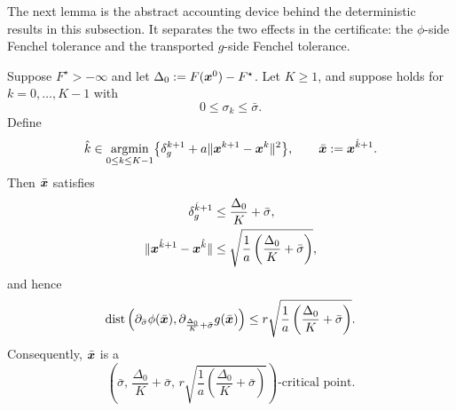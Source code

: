The next lemma is the abstract accounting device behind the
deterministic results in this subsection. It separates the two effects
in the certificate: the $\phi$-side Fenchel tolerance and the
transported $g$-side Fenchel tolerance.

\begin{lemma}
\label{lem:abstract-prox-certificate-bound}
Suppose $F^\star>-\infty$ and let $\Delta_0:=F(\bm{x}^0)-F^\star$. Let
$K\ge1$, and suppose  holds for
$k=0,\ldots,K-1$ with
\[
    0\le\sigma_k\le\bar\sigma .
\]
Define
\[
    \hat k
    \in
    \operatorname*{\mathrm{argmin}}_{0\le k\le K-1}
    \bigl\{
        \delta_g^{k+1}
        +a\|\bm{x}^{k+1}-\bm{x}^k\|^2
    \bigr\},
    \qquad
    \bar{\bm{x}}:=\bm{x}^{\hat k+1}.
\]
Then $\bar{\bm{x}}$ satisfies
\begin{align}
    \delta_g^{\hat k+1}
    &\le
    \frac{\Delta_0}{K}+\bar\sigma,
    \label{eq:abstract-prox-deltag-bound}
    \\
    \|\bm{x}^{\hat k+1}-\bm{x}^{\hat k}\|
    &\le
    \sqrt{
        \frac{1}{a}
        \left(
            \frac{\Delta_0}{K}+\bar\sigma
        \right)
    },
    \label{eq:abstract-prox-step-bound}
\end{align}
and hence
\begin{equation}
    \operatorname{dist}
    \left(
        \partial_{\bar\sigma}\phi(\bar{\bm{x}}),
        \partial_{\frac{\Delta_0}{K}+\bar\sigma}g(\bar{\bm{x}})
    \right)
    \le
    r
    \sqrt{
        \frac{1}{a}
        \left(
            \frac{\Delta_0}{K}+\bar\sigma
        \right)
    } .
    \label{eq:abstract-prox-critical-bound}
\end{equation}
Consequently, $\bar{\bm{x}}$ is a
\[
    \left(
        \bar\sigma,\,
        \frac{\Delta_0}{K}+\bar\sigma,\,
        r
        \sqrt{
            \frac{1}{a}
            \left(
                \frac{\Delta_0}{K}+\bar\sigma
            \right)
        }
    \right)\text{-critical point}.
\]
\end{lemma}

